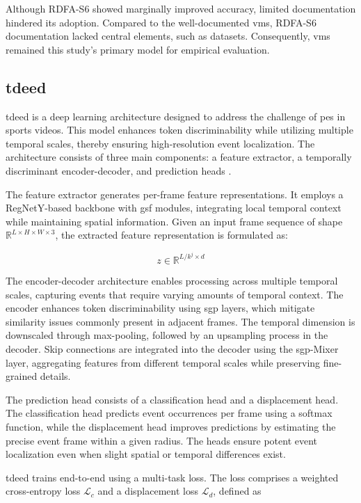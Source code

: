 Although RDFA-S6 showed marginally improved accuracy, limited documentation hindered its adoption. Compared to the well-documented \acrlong{vms}, RDFA-S6 documentation lacked central elements, such as datasets. Consequently, \acrshort{vms} remained this study's primary model for empirical evaluation. 


\subsection{\acrfull{tdeed}}
\label{ssec:tdeed}

\acrfull{tdeed} is a deep learning architecture designed to address the challenge of \acrfull{pes} in sports videos. This model enhances token discriminability while utilizing multiple temporal scales, thereby ensuring high-resolution event localization. The architecture consists of three main components: a feature extractor, a temporally discriminant encoder-decoder, and prediction heads \cite{xarles_t-deed_2024}.

The feature extractor generates per-frame feature representations. It employs a RegNetY-based backbone with \acrfull{gsf} modules, integrating local temporal context while maintaining spatial information. Given an input frame sequence of shape \(\mathbb{R}^{L \times H \times W \times 3}\), the extracted feature representation is formulated as:

\[
z \in \mathbb{R}^{L/{k^j \times d} }
\]

The encoder-decoder architecture enables processing across multiple temporal scales, capturing events that require varying amounts of temporal context. The encoder enhances token discriminability using \acrfull{sgp} layers, which mitigate similarity issues commonly present in adjacent frames. The temporal dimension is downscaled through max-pooling, followed by an upsampling process in the decoder. Skip connections are integrated into the decoder using the \acrshort{sgp}-Mixer layer, aggregating features from different temporal scales while preserving fine-grained details.

The prediction head consists of a classification head and a displacement head. The classification head predicts event occurrences per frame using a softmax function, while the displacement head improves predictions by estimating the precise event frame within a given radius. The heads ensure potent event localization even when slight spatial or temporal differences exist.


\acrshort{tdeed} trains end-to-end using a multi-task loss. The loss comprises a weighted cross-entropy loss \(\mathcal{L}_c\) and a displacement loss \(\mathcal{L}_d\), defined as


